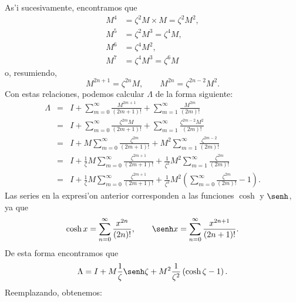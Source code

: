 As'i sucesivamente, encontramos que
\begin{align}
M^4  &  =\zeta^2 M\times M=\zeta^2 M^2 ,\\
M^{5}  &  =\zeta^2 M^3=\zeta^4 M ,\\
M^{6}  &  =\zeta^4 M^2 ,\\
M^{7}  &  =\zeta^4 M^3=\zeta^{6}M
\end{align}
o, resumiendo,
\begin{equation}
M^{2n+1}   =\zeta^{2n} M, \qquad M^{2n}    =\zeta^{2n-2} M^2.
\end{equation}
Con estas relaciones, podemos calcular $\Lambda$ de la forma siguiente:
\begin{eqnarray}
\Lambda &=& I+\sum_{m=0}^{\infty}\frac{M^{2m+1}}{\left(  2m+1\right)  !}
+\sum_{m=1}^{\infty}\frac{M^{2m}}{\left(  2m\right)  !}\\
&=& I+\sum_{m=0}^{\infty}\frac{\zeta^{2m}M}{\left(  2m+1\right)  !}+\sum
_{m=1}^{\infty}\frac{\zeta^{2m-2}M^2}{\left(  2m\right)  !}\\
&=& I+M\sum_{m=0}^{\infty}\frac{\zeta^{2m}}{\left(  2m+1\right)  !}+M^2
\sum_{m=1}^{\infty}\frac{\zeta^{2m-2}}{\left(  2m\right)  !}\\
&=& I+\frac{1}{\zeta}M\sum_{m=0}^{\infty}\frac{\zeta^{2m+1}}{\left(
2m+1\right)  !}+\frac{1}{\zeta^2}M^2\sum_{m=1}^{\infty}\frac{\zeta^{2m}}{\left(
2m\right)  !}\\
&=& I+\frac{1}{\zeta}M\sum_{m=0}^{\infty}\frac{\zeta^{2m+1}}{\left(
2m+1\right)  !}+\frac{1}{\zeta^2}M^2\left(
\sum_{m=0}^{\infty}\frac{\zeta^{2m}}{\left(  2m\right)  !}-1\right).
\end{eqnarray}
Las series en la expresi'on anterior corresponden a las funciones $\cosh$ y
$\senh$, ya que
\begin{equation}
\cosh x =\sum_{n=0}^{\infty}\frac{x^{2n}}{\left(  2n\right)  !}, \qquad
\senh x =\sum_{n=0}^{\infty}\frac{x^{2n+1}}{\left(  2n+1\right)  !}.
\end{equation}
De esta forma encontramos que
\begin{equation}
\Lambda
=I+M\frac{1}{\zeta}\senh\zeta+M^2\frac{1}{\zeta^2}\left(\cosh\zeta-1\right).
\end{equation}
Reemplazando, obtenemos:
